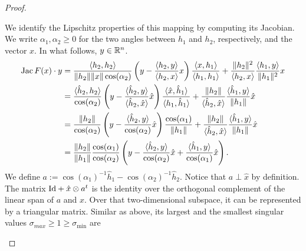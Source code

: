 \documentclass[10pt,a4paper]{article}
\begin{document}
\begin{proof}
\begin{itemize}
        We identify the Lipschitz properties of this mapping by computing its Jacobian. 
        We write $\alpha_1, \alpha_2 \geq 0$ for the two angles between $h_1$ and $h_2$, respectively, and the vector $x$.
        In what follows, $y \in {\mathbb R}^{n}$.
        \begin{align*}
            \operatorname{{\rm Jac}} F(x) \cdot y
            &=
            \frac{ \langle h_2, h_2 \rangle }{ \|h_2\| \|x\| \cos(\alpha_2) }
            \left( y - \frac{ \langle h_2, y \rangle }{ \langle h_2, x \rangle } x \right)
            \frac{ \langle x, h_1 \rangle }{ \langle h_1, h_1 \rangle }
            +
            \frac{ \| h_2 \|^{2} }{ \langle h_2, x \rangle }
            \frac{ \langle h_1, y \rangle }{ \| h_1 \|^{2} }
            x
            \\&=
            \frac{ \langle \hat h_2, h_2 \rangle }{ \cos(\alpha_2) }
            \left( y - \frac{ \langle \hat h_2, y \rangle }{ \langle \hat h_2, \hat x \rangle } \hat x \right)
            \frac{ \langle \hat x, \hat h_1 \rangle }{ \langle h_1, \hat h_1 \rangle }
            +
            \frac{ \| h_2 \| }{ \langle \hat h_2, \hat x \rangle }
            \frac{ \langle \hat h_1, y \rangle }{ \| h_1 \| }
            \hat x
            \\&=
            \frac{ \| h_2 \| }{ \cos(\alpha_2) }
            \left( y - \frac{ \langle \hat h_2, y \rangle }{ \cos(\alpha_2) } \hat x \right)
            \frac{ \cos(\alpha_1) }{ \| h_1 \| }
            +
            \frac{ \| h_2 \| }{ \langle \hat h_2, \hat x \rangle }
            \frac{ \langle \hat h_1, y \rangle }{ \| h_1 \| }
            \hat x
            \\&=
            \frac{ \| h_2 \| }{ \| h_1 \| }
            \frac{ \cos(\alpha_1) }{ \cos(\alpha_2) }
            \left( 
                y 
                - 
                \frac{ \langle \hat h_2, y \rangle }{ \cos(\alpha_2) } \hat x 
                + 
                \frac{ \langle \hat h_1, y \rangle }{ \cos(\alpha_1) } \hat x 
            \right)
            .
        \end{align*}
        We define $a := \cos(\alpha_1)^{-1} \hat h_1 - \cos(\alpha_2)^{-1} \hat h_2$. 
        Notice that $a \perp \hat x$ by definition. The matrix ${\rm Id} + \hat x \otimes a^{t}$ is the identity over the orthogonal complement of the linear span of $a$ and $x$. Over that two-dimensional subspace, it can be represented by a triangular matrix.
        Similar as above, its largest and the smallest singular values $\sigma_{max} \geq 1 \geq \sigma_{\min}$ are

\end{itemize}
\end{proof}
\end{document}
